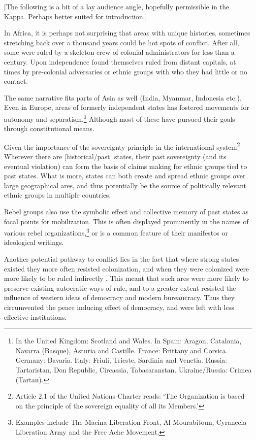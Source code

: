 [The following is a bit of a lay audience angle, hopefully permissible in the
Kappa. Perhaps better suited for introduction.]

In Africa, it is perhaps not surprising that areas with unique
histories, sometimes stretching back over a thousand years could be hot spots of
conflict. After all, some were ruled by a skeleton crew of colonial
administrators \citep{englebert2013inside} for less than a century. Upon
independence found themselves ruled from distant capitals, at times by
pre-colonial adversaries or ethnic groups with who they had little or no
contact. 

The same narrative fits parts of Asia as well (India, Myanmar, Indonesia etc.).
Even in Europe, areas of formerly independent states has fostered movements for
autonomy and separatism.\footnote{In the United Kingdom: Scotland and Wales. In Spain:
Aragon, Catalonia, Navarra (Basque), Asturia and Castille. France: Brittany and
Corsica. Germany: Bavaria. Italy: Friuli, Trieste, Sardinia and Venetia. Russia:
Tartaristan, Don Republic, Circassia, Tabasaranstan. Ukraine/Russia: Crimea
(Tartan).} Although most of these have pursued their goals through
constitutional means.

Given the importance of the sovereignty principle in the international
system\footnote{Article 2.1 of the United Nations Charter reads: `The
Organization is based on the principle of the sovereign equality of all its
Members.'} Wherever there are [historical/past] states, their past sovereignty
(and its eventual violation) can form the basis of claims making for ethnic
groups tied to past states. What is more, states can both create and spread
ethnic groups over large geographical ares, and thus potentially be the source
of politically relevant ethnic groups in multiple countries. 

Rebel groups also use the symbolic effect and collective memory
of past states as focal points for mobilization. This is often displayed
prominently in the names of various rebel organizations,\footnote{Examples
include The Macina Liberation Front, Al Mourabitoun, Cyranecia Liberation Army
and the Free Ache Movement.} or is a common feature of their manifestos or
ideological writings.

Another potential pathway to conflict lies in the fact that where strong states
existed they more often resisted colonization, and when they were colonized were
more likely to be ruled indirectly \citep{Englebert2000, Gerring2011,
Hariri2012}. This meant that such ares were more likely to preserve existing
autocratic ways of rule, and to a greater extent resisted the influence of
western ideas of democracy and modern bureaucracy. Thus they circumvented the
peace inducing effect of democracy, and were left with less effective
institutions.


